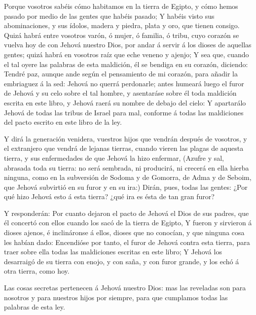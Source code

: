  Porque vosotros sabéis cómo habitamos en la tierra de
Egipto, y cómo hemos pasado por medio de las gentes que habéis pasado;
 Y habéis visto sus abominaciones, y sus ídolos, madera y
piedra, plata y oro, que tienen consigo.  Quizá habrá
entre vosotros varón, ó mujer, ó familia, ó tribu, cuyo corazón se
vuelva hoy de con Jehová nuestro Dios, por andar á servir á los dioses
de aquellas gentes; quizá habrá en vosotros raíz que eche veneno y
ajenjo;  Y sea que, cuando el tal oyere las palabras de
esta maldición, él se bendiga en su corazón, diciendo: Tendré paz,
aunque ande según el pensamiento de mi corazón, para añadir la
embriaguez á la sed:  Jehová no querrá perdonarle; antes
humeará luego el furor de Jehová y su celo sobre el tal hombre, y
asentaráse sobre él toda maldición escrita en este libro, y Jehová raerá
su nombre de debajo del cielo:  Y apartarálo Jehová de
todas las tribus de Israel para mal, conforme á todas las maldiciones
del pacto escrito en este libro de la ley.

 Y dirá la generación venidera, vuestros hijos que
vendrán después de vosotros, y el extranjero que vendrá de lejanas
tierras, cuando vieren las plagas de aquesta tierra, y sus enfermedades
de que Jehová la hizo enfermar,  (Azufre y sal, abrasada
toda su tierra: no será sembrada, ni producirá, ni crecerá en ella
hierba ninguna, como en la subversión de Sodoma y de Gomorra, de Adma y
de Seboim, que Jehová subvirtió en su furor y en su ira:)
 Dirán, pues, todas las gentes: ¿Por qué hizo Jehová esto
á esta tierra? ¿qué ira es ésta de tan gran furor?

 Y responderán: Por cuanto dejaron el pacto de Jehová el
Dios de sus padres, que él concertó con ellos cuando los sacó de la
tierra de Egipto,  Y fueron y sirvieron á dioses ajenos,
é inclináronse á ellos, dioses que no conocían, y que ninguna cosa les
habían dado:  Encendióse por tanto, el furor de Jehová
contra esta tierra, para traer sobre ella todas las maldiciones escritas
en este libro;  Y Jehová los desarraigó de su tierra con
enojo, y con saña, y con furor grande, y los echó á otra tierra, como
hoy.

 Las cosas secretas pertenecen á Jehová nuestro Dios: mas
las reveladas son para nosotros y para nuestros hijos por siempre, para
que cumplamos todas las palabras de esta ley.

